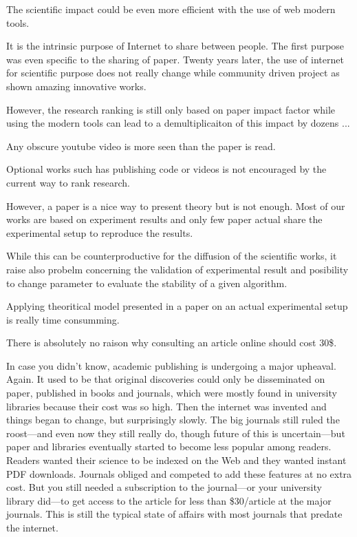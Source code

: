 The scientific impact could be even more efficient with the use of web modern tools.

It is the intrinsic purpose of Internet to share between people. The first purpose was even specific to the sharing of paper. Twenty years later, the use of internet for scientific purpose does not really change while community driven project as shown amazing innovative works.

However, the research ranking is still only based on paper impact factor while using the modern tools can lead to a demultiplicaiton of this impact by dozens ...

Any obscure youtube video is more seen than the paper is read.

Optional works such has publishing code or videos is not encouraged by the current way to rank research.

However, a paper is a nice way to present theory but is not enough. Most of our works are based on experiment results and only few paper actual share the experimental setup to reproduce the results.

While this can be counterproductive for the diffusion of the scientific works, it raise also probelm concerning the validation of experimental result and posibility to change parameter to evaluate the stability of a given algorithm.

Applying theoritical model presented in a paper on an actual experimental setup is really time consumming.

There is absolutely no raison why consulting an article online should cost 30\$.

In case you didn’t know, academic publishing is undergoing a major upheaval. Again. It used to be that original discoveries could only be disseminated on paper, published in books and journals, which were mostly found in university libraries because their cost was so high. Then the internet was invented and things began to change, but surprisingly slowly. The big journals still ruled the roost—and even now they still really do, though future of this is uncertain—but paper and libraries eventually started to become less popular among readers. Readers wanted their science to be indexed on the Web and they wanted instant PDF downloads. Journals obliged and competed to add these features at no extra cost. But you still needed a subscription to the journal—or your university library did—to get access to the article for less than \$30/article at the major journals. This is still the typical state of affairs with most journals that predate the internet.

